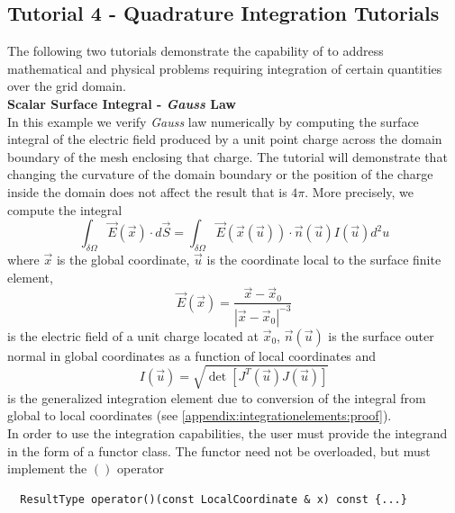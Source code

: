 \subsection{Tutorial 4 - Quadrature Integration Tutorials}
\label{usage-howto-tutorial-integration-quadrature}

The following two tutorials demonstrate the capability of \curvgrid{} to address mathematical and physical problems requiring integration of certain quantities over the grid domain. \\


\noindent
\textbf{Scalar Surface Integral - \textit{Gauss} Law} \\
%
\noindent
In this example we verify \textit{Gauss} law numerically by computing the surface integral of the electric field produced by a unit point charge across the domain boundary of the mesh enclosing that charge. The tutorial will demonstrate that changing the curvature of the domain boundary or the position of the charge inside the domain does not affect the result that is $4 \pi$. More precisely, we compute the integral
\[\int_{\delta \Omega} \vec{E}(\vec{x}) \cdot d\vec{S} = \int_{\delta \Omega} \vec{E}(\vec{x}(\vec{u})) \cdot \vec{n}(\vec{u}) I(\vec{u}) d^2 u \]
\noindent
where $\vec{x}$ is the global coordinate, $\vec{u}$ is the coordinate local to the surface finite element,
\[\vec{E}(\vec{x}) = \frac{\vec{x} - \vec{x}_0}{|\vec{x} - \vec{x}_0|^{-3}}\]
is the electric field of a unit charge located at $\vec{x}_0$, $\vec{n}(\vec{u})$ is the surface outer normal in global coordinates as a function of local coordinates and
\[I(\vec{u}) = \sqrt{\det [ J^T(\vec{u}) J(\vec{u}) ]}\]
is the generalized integration element due to conversion of the integral from global to local coordinates (see \cref{appendix:integrationelements:proof}). \\

\noindent
In order to use the \curvgeom{} integration capabilities, the user must provide the integrand in the form of a functor class. The functor need not be overloaded, but must implement the $()$ operator

\begin{mybox}
\begin{lstlisting}
  ResultType operator()(const LocalCoordinate & x) const {...}
\end{lstlisting}
\end{mybox}


